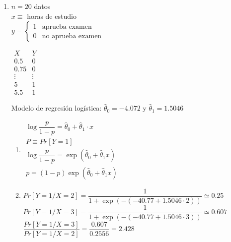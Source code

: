 \begin{enumerate}[label=\color{red}\textbf{\arabic*)}, leftmargin=*]
	\item \lb{}
	
	$n=20$ datos\\
	$x\equiv$ horas de estudio\\
	$y=\begin{cases}
		1 & \text{aprueba examen}\\
		0 & \text{no aprueba examen}
	\end{cases}$
	
	$\begin{array}{c|c}
		X & Y\\ \hline
		0.5 & 0\\
		0.75 & 0\\
		\vdots & \vdots\\
		5 & 1\\
		5.5 & 1
	\end{array}$
	
	Modelo de regresión logística: $\hat{\theta}_0=-4.072$ y $\hat{\theta}_1=1.5046$
	\begin{enumerate}[label=\color{red}\alph*)]
		\item {}
		
		$\begin{array}{l}
			\log\dfrac{p}{1-p}=\hat{\theta}_0+\hat{\theta}_1\cdot x\\
			P\equiv Pr[Y=1]\\
			\log\dfrac{p}{1-p}=\exp(\hat{\theta}_0+\hat{\theta}_1x)\\
			p=(1-p)\exp(\hat{\theta}_0+\hat{\theta}_1x)
		\end{array}$
		\item 
		
		$Pr[Y=1/X=2]=\dfrac{1}{1+\exp(-(-40.77+1.5046\cdot2))}\simeq0.25$\\
		$Pr[Y=1/X=3]=\dfrac{1}{1+\exp(-(-40.77+1.5046\cdot3))}\simeq0.607$\\
		$\dfrac{Pr[Y=1/X=3]}{Pr[Y=1/X=2]}=\dfrac{0.607}{0.2556}=2.428$
		
	\end{enumerate}
\end{enumerate}